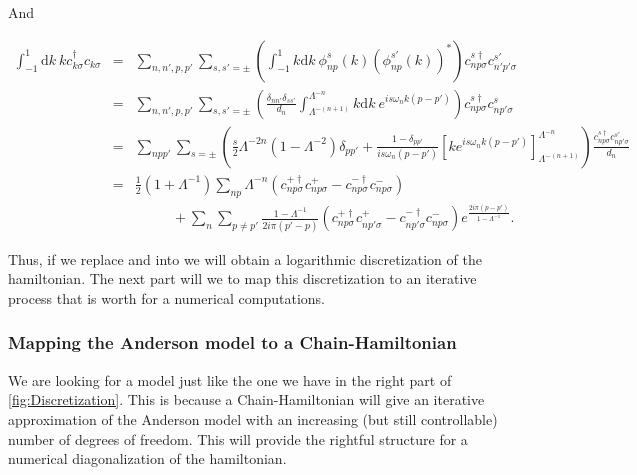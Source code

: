 And 

\begin{eqnarray}
\int_{-1}^{1}\mbox{d}k\ kc_{k\sigma}^{\dagger}c_{k\sigma} & = & \sum_{n,n',p,p'}\sum_{s,s'=\pm}\left(\int_{-1}^{1}k\mbox{d}k\ \phi_{np}^{s}(k)\left(\phi_{np}^{s'}(k)\right)^{*}\right)c_{np\sigma}^{s\dagger}c_{n'p'\sigma}^{s'}\nonumber \\
 & = & \sum_{n,n',p,p'}\sum_{s,s'=\pm}\left(\frac{\delta_{nn'}\delta_{ss'}}{d_{n}}\int_{\Lambda^{-(n+1)}}^{\Lambda^{-n}}k\mbox{d}k\ e^{is\omega_{n}k\left(p-p'\right)}\right)c_{np\sigma}^{s\dagger}c_{np'\sigma}^{s}\nonumber \\
 & = & \sum_{npp'}\sum_{s=\pm}\left(\frac{s}{2}\Lambda^{-2n}\left(1-\Lambda^{-2}\right)\delta_{pp'}+\frac{1-\delta_{pp'}}{is\omega_{n}\left(p-p'\right)}\left[ke^{is\omega_{n}k\left(p-p'\right)}\right]_{\Lambda^{-(n+1)}}^{\Lambda^{-n}}\right)\frac{c_{np\sigma}^{s\dagger}c_{np'\sigma}^{s'}}{d_{n}}\nonumber \\
 & = & \frac{1}{2}\left(1+\Lambda^{-1}\right)\sum_{np}\Lambda^{-n}\left(c_{np\sigma}^{+\dagger}c_{np\sigma}^{+}-c_{np\sigma}^{-\dagger}c_{np\sigma}^{-}\right)\nonumber \\
 &  & \ \ \ \ \ \ \!\ \ \ \ \!\ \ +\sum_{n}\sum_{p\neq p'}\frac{1-\Lambda^{-1}}{2i\pi\left(p'-p\right)}\left(c_{np\sigma}^{+\dagger}c_{np'\sigma}^{+}-c_{np'\sigma}^{-\dagger}c_{np\sigma}^{-}\right)e^{\frac{2i\pi\left(p-p'\right)}{1-\Lambda^{-1}}}.\label{eq:second-integral}
\end{eqnarray}


Thus, if we replace  and 
into  we will obtain a logarithmic discretization
of the hamiltonian. The next part will we to map this discretization
to an iterative process that is worth for a numerical computations. 

\subsubsection{Mapping the Anderson model to a Chain-Hamiltonian}

We are looking for a model just like the one we have in the right part of  \ref{fig:Discretization}.
This is because a Chain-Hamiltonian will give an iterative approximation
of the Anderson model with an increasing (but still controllable)
number of degrees of freedom. This will provide the rightful structure
for a numerical diagonalization of the hamiltonian. \\

